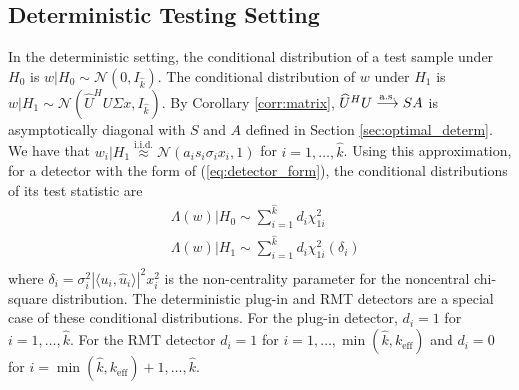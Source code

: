 \subsection{Deterministic Testing Setting}\label{sec:roc_determ}
In the deterministic setting, the conditional distribution of a test sample under $H_0$ is $w|H_0\sim\mathcal{N}(0,I_{\widehat{k}})$. The conditional distribution of $w$ under $H_1$ is $w|H_1\sim\mathcal{N}(\widehat{U}^HU\Sigma x,I_{\widehat{k}})$. By Corollary \ref{corr:matrix}, $\widehat{U}^HU\overset{\textrm{a.s.}}{\longrightarrow} SA$ is asymptotically diagonal with $S$ and $A$ defined in Section \ref{sec:optimal_determ}. We have that $w_i|H_1\overset{\text{i.i.d.}}{\approx}\mathcal{N}(a_is_i\sigma_ix_i,1)$ for $i=1,\dots,\widehat{k}$. Using this approximation, for a detector with the form of (\ref{eq:detector_form}), the conditional distributions of its test statistic are
\begin{equation}\label{eq:determ_stat_distr}
\begin{aligned}
&\Lambda(w)|H_0 \sim \sum_{i=1}^{\widehat{k}} d_i\chi_{1i}^2\\
&\Lambda(w)|H_1\sim\sum_{i=1}^{\widehat{k}}d_i\chi_{1i}^2(\delta_i)\\
\end{aligned}
\end{equation}
where $\delta_i=\sigma_i^2|\langle u_i,\widehat{u}_i\rangle|^2x_i^2$ is the non-centrality parameter for the noncentral chi-square distribution. The deterministic plug-in and RMT detectors are a special case of these conditional distributions. For the plug-in detector, $d_i=1$ for $i=1,\dots,\widehat{k}$. For the RMT detector $d_i=1$ for $i=1,\dots,\min(\widehat{k},k_\text{eff})$ and $d_i=0$ for $i=\min(\widehat{k},k_\text{eff})+1,\dots,\widehat{k}$.

